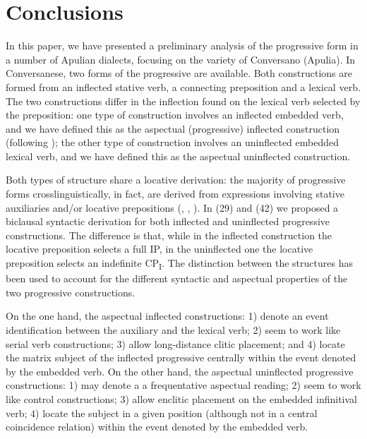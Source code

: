 \documentclass[output=paper]{langsci/langscibook}
\begin{document}
\section{Conclusions}%
In this paper, we have presented a preliminary analysis of the progressive form in a number of Apulian dialects, focusing on the variety of Conversano (Apulia). In Conversanese, two forms of the progressive are available. Both constructions are formed from an inflected stative verb, a connecting preposition and a lexical verb. The two constructions differ in the inflection found on the lexical verb selected by the preposition: one type of construction involves an inflected embedded verb, and we have defined this as the aspectual (progressive) inflected construction (following \citealt{Manzini2005}); the other type of construction involves an uninflected embedded lexical verb, and we have defined this as the aspectual uninflected construction. 

Both types of structure share a locative derivation: the majority of progressive forms crosslinguistically, in fact, are derived from expressions involving stative auxiliaries and\slash or locative prepositions (\citealt{Bybee1994}, \citealt{Mateu1999}, \citealt{Laka2006}). In (29) and (42) we proposed a biclausal syntactic derivation for both inflected and uninflected progressive constructions. The difference is that, while in the inflected construction the locative preposition selects a full IP, in the uninflected one the locative preposition selects an indefinite CP\textsubscript{I}. The distinction between the structures has been used to account for the different syntactic and aspectual properties of the two progressive constructions. 

On the one hand, the aspectual inflected constructions: 1) denote an event identification between the auxiliary and the lexical verb; 2) seem to work like serial verb constructions; 3) allow long-distance clitic placement; and 4) locate the matrix subject of the inflected progressive centrally within the event denoted by the embedded verb. On the other hand, the aspectual uninflected progressive constructions: 1) may denote a a frequentative aspectual reading; 2) seem to work like control constructions; 3) allow enclitic placement on the embedded infinitival verb; 4) locate the subject in a given position (although not in a central coincidence relation) within the event denoted by the embedded verb. 
\end{document}
